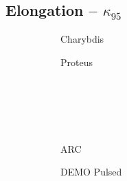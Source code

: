 \clearpage

\newpage

\subsection*{ Elongation -- $\kappa_{95}$ }
  \label{subsection:sensitivity_kappa_95}

\begin{figure*}[h!]
    \centering
    \hfill
    \begin{subfigure}[t]{0.45\textwidth}
        \centering
    \begin{adjustbox}{width=\textwidth}
      \Large
      
    \end{adjustbox}
        \caption{Charybdis}
    \end{subfigure}
    \hfill
    \begin{subfigure}[t]{0.45\textwidth}
        \centering
    \begin{adjustbox}{width=\textwidth}
      \Large
      
    \end{adjustbox}
        \caption{Proteus}
    \end{subfigure}
    \hfill \hfill ~\\ ~\\ ~\\ ~\\
    \hfill
    \begin{subfigure}[t]{0.45\textwidth}
        \centering
    \begin{adjustbox}{width=\textwidth}
      \Large
      
    \end{adjustbox}
        \caption{ARC}
    \end{subfigure}
    \hfill
    \begin{subfigure}[t]{0.45\textwidth}
        \centering
    \begin{adjustbox}{width=\textwidth}
      \Large
      
    \end{adjustbox}
        \caption{DEMO Pulsed}
    \end{subfigure}
    \hfill \hfill ~\\ ~\\ ~\\ ~\\
    \hfill
    \begin{subfigure}[t]{0.45\textwidth}
        \centering

\end{subfigure}
\end{figure*}
